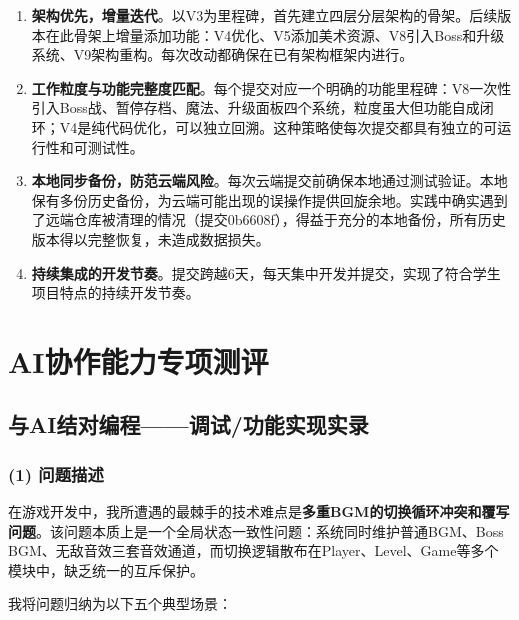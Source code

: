 \documentclass[12pt,a4paper]{ctexart}
\begin{document}
\begin{enumerate}[label=(\arabic*)]
    \item \textbf{架构优先，增量迭代}。以V3为里程碑，首先建立四层分层架构的骨架。后续版本在此骨架上增量添加功能：V4优化、V5添加美术资源、V8引入Boss和升级系统、V9架构重构。每次改动都确保在已有架构框架内进行。

    \item \textbf{工作粒度与功能完整度匹配}。每个提交对应一个明确的功能里程碑：V8一次性引入Boss战、暂停存档、魔法、升级面板四个系统，粒度虽大但功能自成闭环；V4是纯代码优化，可以独立回溯。这种策略使每次提交都具有独立的可运行性和可测试性。

    \item \textbf{本地同步备份，防范云端风险}。每次云端提交前确保本地通过测试验证。本地保有多份历史备份，为云端可能出现的误操作提供回旋余地。实践中确实遇到了远端仓库被清理的情况（提交0b6608f），得益于充分的本地备份，所有历史版本得以完整恢复，未造成数据损失。

    \item \textbf{持续集成的开发节奏}。提交跨越6天，每天集中开发并提交，实现了符合学生项目特点的持续开发节奏。
\end{enumerate}


\section{AI协作能力专项测评}

\subsection{与AI结对编程——调试/功能实现实录}

\subsubsection{(1) 问题描述}

在游戏开发中，我所遭遇的最棘手的技术难点是\textbf{多重BGM的切换循环冲突和覆写问题}。该问题本质上是一个全局状态一致性问题：系统同时维护普通BGM、Boss BGM、无敌音效三套音效通道，而切换逻辑散布在Player、Level、Game等多个模块中，缺乏统一的互斥保护。

我将问题归纳为以下五个典型场景：
\end{document}
